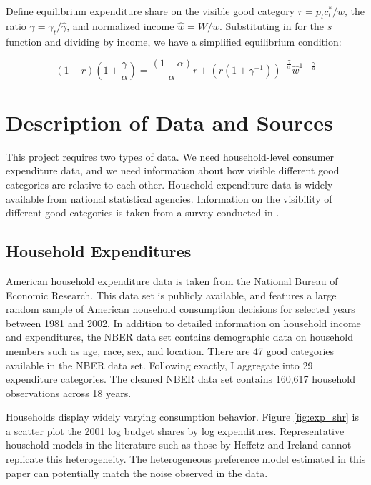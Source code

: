 \documentclass[12pt]{article}
\begin{document}
Define equilibrium expenditure share on the visible good category $r = p_t c_t^* / w$, the ratio $\gamma = \gamma_t / \hat{\gamma}$, and normalized income $\hat{w} = \underbar{W} / w$.  Substituting in for the $s$ function and dividing by income, we have a simplified equilibrium condition:

\begin{equation}
	\label{eq:eq_cond}
    (1 - r)(1 + \frac{\gamma}{\alpha}) = \frac{\left(1-\alpha\right)}{\alpha} r +  \left(r\left(1 + \gamma^{-1}\right)\right)^{-\frac{\gamma}{\alpha}}\hat{w}^{1+\frac{\gamma}{\alpha}}
\end{equation}

\section{Description of Data and Sources}
This project requires two types of data.  We need household-level consumer expenditure data, and we need information about how visible different good categories are relative to each other.  Household expenditure data is widely available from national statistical agencies.  Information on the visibility of different good categories is taken from a survey conducted in \citet{heffetz2011}.

\subsection{Household Expenditures}
American household expenditure data is taken from the National Bureau of Economic Research.\citep{NBERCEX2011}  This data set is publicly available, and features a large random sample of American household consumption decisions for selected years between 1981 and 2002.  In addition to detailed information on household income and expenditures, the NBER data set contains demographic data on household members such as age, race, sex, and location.
There are 47 good categories available in the NBER data set.
Following \citet{heffetz2011} exactly,\footnotemark{} I aggregate into 29 expenditure categories.
The cleaned NBER data set contains 160,617 household observations across 18 years.

Households display widely varying consumption behavior.  Figure \ref{fig:exp_shr} is a scatter plot the 2001 log budget shares by log expenditures.  Representative household models in the literature such as those by Heffetz and Ireland cannot replicate this heterogeneity.\footnotemark{} The heterogeneous preference model estimated in this paper can potentially match the noise observed in the data.
\end{document}
